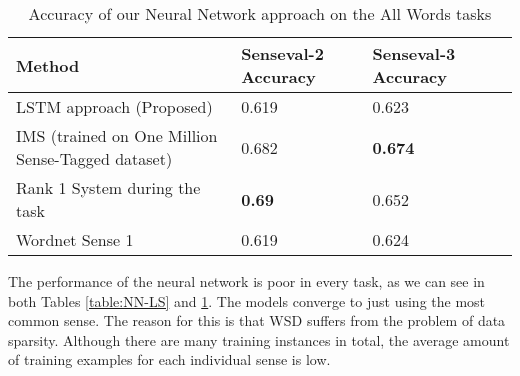 \begin{table}
	\caption{Accuracy of our Neural Network approach on the All Words tasks}
	\label{table:NN_AW}
	\begin{center}
		\begin{tabular}{| p{7cm} | p{2cm} | p{2cm} | p{2cm} | }
			\hline
			Method & Senseval-2 Accuracy & Senseval-3 Accuracy\\
			\hline
			LSTM approach (Proposed) & 0.619  & 0.623  \\
			
			\hline
			IMS (trained on One Million Sense-Tagged dataset) & 0.682 & {\bf0.674} \\
			\hline
			Rank 1 System during the task & {\bf0.69} & 0.652  \\
			\hline
			Wordnet Sense 1 & 0.619 & 0.624  \\
			\hline
		\end{tabular}
	\end{center}
\end{table}

The performance of the neural network is poor in every task, as we can see in both Tables \ref{table:NN-LS} and \ref{table:NN_AW}. The models converge to just using the most common sense. The reason for this is that WSD suffers from the problem of data sparsity. Although there are many training instances in total, the average amount of training examples for each individual sense is low. 